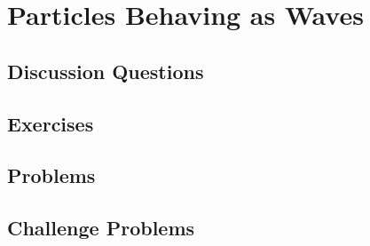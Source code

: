 
\chapter{Particles Behaving as Waves}

\section{Discussion Questions}

\section{Exercises}

\section{Problems}

\section{Challenge Problems}
